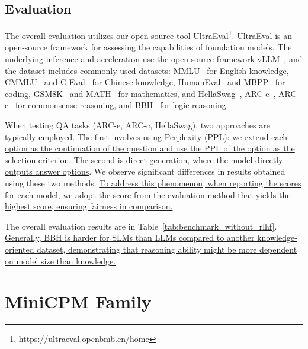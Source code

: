 \subsection{Evaluation}
\label{sec:evaluation}

The overall evaluation utilizes our open-source tool UltraEval\footnote{https://ultraeval.openbmb.cn/home}. UltraEval is an open-source framework for assessing the capabilities of foundation models. The underlying inference and acceleration use the open-source framework \uline{vLLM}~\citep{kwon2023efficient}, and the dataset includes commonly used datasets: \uline{MMLU}~\citep{hendrycks2020measuring} for English knowledge, \uline{CMMLU}~\citep{li2024cmmlu} and \uline{C-Eval}~\citep{huang2024c} for Chinese knowledge, \uline{HumanEval}~\citep{chen2021evaluating} and \uline{MBPP}~\citep{austin2021program} for coding, \uline{GSM8K}~\citep{cobbe2021training} and \uline{MATH}~\citep{hendrycks2021measuring} for mathematics, and \uline{HellaSwag}~\citep{zellers2019hellaswag}, \uline{ARC-e}~\citep{clark2018think}, \uline{ARC-c}~\citep{clark2018think} for commonsense reasoning, and \uline{BBH}~\citep{suzgun2022challenging} for logic reasoning.

When testing QA tasks (ARC-e, ARC-c, HellaSwag), two approaches are typically employed. The first involves using Perplexity (PPL): \uline{we extend each option as the continuation of the question and use the PPL of the option as the selection criterion.} The second is direct generation, where \uline{the model directly outputs answer options}. We observe significant differences in results obtained using these two methods. \uline{To address this phenomenon, when reporting the scores for each model, we adopt the score from the evaluation method that yields the highest score, ensuring fairness in comparison.}

The overall evaluation results are in Table~\ref{tab:benchmark_without_rlhf}. \uline{Generally, BBH is harder for SLMs than LLMs compared to another knowledge-oriented dataset, demonstrating that reasoning ability might be more dependent on model size than knowledge.}



\section{MiniCPM Family}




